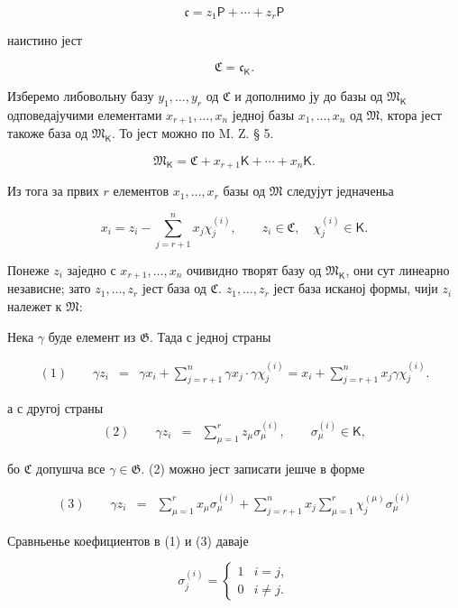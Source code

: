 \documentclass[11pt]{article}
\begin{document}
\[
\mathfrak c=z_1\mathsf P+\cdots+z_r\mathsf P
\]

наистино јест

\[
\mathfrak C=\mathfrak c_{\mathsf K}.
\]

Изберемо либовольну базу \(y_1,\ldots,y_r\) од \(\mathfrak C\) и дополнимо ју до базы од \(\mathfrak M_{\mathsf K}\) одповедајучими елементами \(x_{r+1},\ldots,x_n\) једној базы \(x_1,\ldots,x_n\) од \(\mathfrak M\), ктора јест такоже база од \(\mathfrak M_{\mathsf K}\). То јест можно по M. Z. § 5.

\[
\mathfrak M_{\mathsf K}=\mathfrak C+x_{r+1}\mathsf K+\cdots+x_n\mathsf K.
\]

Из тога за првих \(r\) елементов \(x_1,\ldots,x_r\) базы од \(\mathfrak M\) следујут једначеньа

\[
x_i=z_i-\sum_{j=r+1}^{n}x_j\chi_j^{(i)},\qquad
z_i\in\mathfrak C,\quad \chi_j^{(i)}\in\mathsf K.
\]

Понеже \(z_i\) заједно с \(x_{r+1},\ldots,x_n\) очивидно творят базу од \(\mathfrak M_{\mathsf K}\), они сут линеарно независне; зато \(z_1,\ldots,z_r\) јест база од \(\mathfrak C\). \(z_1,\ldots,z_r\) јест база исканој формы, чији \(z_i\) належет к \(\mathfrak M\):

Нека \(\gamma\) буде елемент из \(\mathfrak G\). Тада с једној страны

\[
\begin{array}{rcl}
(1)\qquad \gamma z_i
&=&\gamma x_i+\displaystyle\sum_{j=r+1}^{n}\gamma x_j\cdot \gamma\chi_j^{(i)}
=x_i+\displaystyle\sum_{j=r+1}^{n}x_j\gamma\chi_j^{(i)}.
\end{array}
\]

а с другој страны
\[
\begin{array}{rcl}
(2)\qquad \gamma z_i&=&\displaystyle\sum_{\mu=1}^{r}z_\mu\sigma_\mu^{(i)},
\qquad \sigma_\mu^{(i)}\in\mathsf K,
\end{array}
\]

бо \(\mathfrak C\) допушча все \(\gamma\in\mathfrak G\). (2) можно јест записати јешче в форме

\[
\begin{array}{rcl}
(3)\qquad \gamma z_i
&=&\displaystyle\sum_{\mu=1}^{r}x_\mu\sigma_\mu^{(i)}
+\displaystyle\sum_{j=r+1}^{n}x_j\sum_{\mu=1}^{r}\chi_j^{(\mu)}\sigma_\mu^{(i)}
\end{array}
\]

Сравньенье коефициентов в (1) и (3) даваје

\[
\sigma_j^{(i)}=
\begin{cases}
1 & i=j,\\
0 & i\ne j.
\end{cases}
\]
\end{document}
